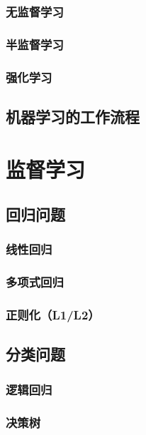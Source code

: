 \documentclass[12pt,UTF8]{ctexbook}
\begin{document}
\subsection{无监督学习}

\subsection{半监督学习}

\subsection{强化学习}

\section{机器学习的工作流程}

\chapter{监督学习}
\label{chap:supervised_learning}

\section{回归问题}

\subsection{线性回归}

\subsection{多项式回归}

\subsection{正则化（L1/L2）}

\section{分类问题}

\subsection{逻辑回归}

\subsection{决策树}
\end{document}
